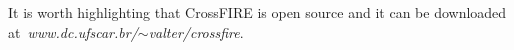  It is worth highlighting that CrossFIRE is open source and it can be downloaded at\textit{~www.dc.ufscar.br/$\sim$valter/crossfire}.










